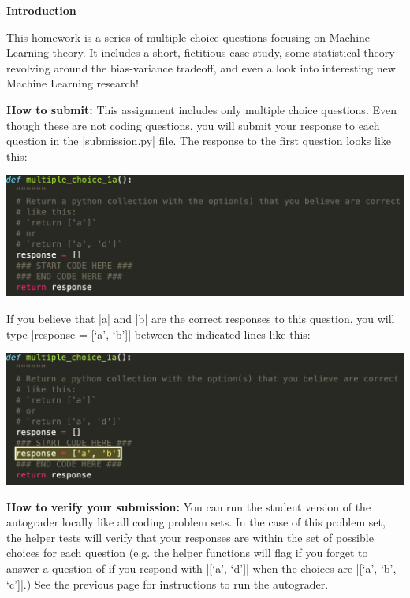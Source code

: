 {\bf Introduction}

This homework is a series of multiple choice questions focusing on Machine
Learning theory.  It includes a short, fictitious case study, some statistical
theory revolving around the bias-variance tradeoff, and even a look into
interesting new Machine Learning research!

{\bf How to submit:}  This assignment includes only multiple choice questions.
Even though these are not coding questions, you will submit your response to
each question in the |submission.py| file.  The response to the first question
looks like this:

\begin{center}
\includegraphics[width=1\textwidth]{sample_question_empty.png}
\end{center}

If you believe that |a| and |b| are the correct responses to this question, you
will type |response = [`a', `b']| between the indicated lines like this:

\begin{center}
\includegraphics[width=1\textwidth]{sample_question_complete.png}
\end{center}

{\bf How to verify your submission:}
You can run the student version of the autograder locally like all coding
problem sets.  In the case of this problem set, the helper tests will verify
that your responses are within the set of possible choices for each question
(e.g. the helper functions will flag if you forget to answer a question of if
you respond with |[`a', `d']| when the choices are |[`a', `b', `c']|.)  See the
previous page for instructions to run the autograder.
